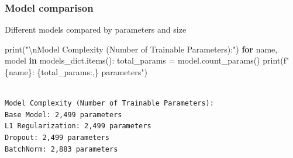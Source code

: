 \documentclass[
]{IEEEtran}
\newenvironment{Shaded}{\begin{snugshade}}{\end{snugshade}}
\newcommand{\BuiltInTok}[1]{\textcolor[rgb]{0.00,0.23,0.31}{#1}}
\newcommand{\CharTok}[1]{\textcolor[rgb]{0.13,0.47,0.30}{#1}}
\newcommand{\ControlFlowTok}[1]{\textcolor[rgb]{0.00,0.23,0.31}{\textbf{#1}}}
\newcommand{\KeywordTok}[1]{\textcolor[rgb]{0.00,0.23,0.31}{\textbf{#1}}}
\newcommand{\NormalTok}[1]{\textcolor[rgb]{0.00,0.23,0.31}{#1}}
\newcommand{\OperatorTok}[1]{\textcolor[rgb]{0.37,0.37,0.37}{#1}}
\newcommand{\SpecialCharTok}[1]{\textcolor[rgb]{0.37,0.37,0.37}{#1}}
\newcommand{\SpecialStringTok}[1]{\textcolor[rgb]{0.13,0.47,0.30}{#1}}
\newcommand{\StringTok}[1]{\textcolor[rgb]{0.13,0.47,0.30}{#1}}
\begin{document}
\subsubsection{Model comparison}\label{model-comparison}

Different models compared by parameters and size

\begin{Shaded}
\begin{Highlighting}[]
\BuiltInTok{print}\NormalTok{(}\StringTok{"}\CharTok{\textbackslash{}n}\StringTok{Model Complexity (Number of Trainable Parameters):"}\NormalTok{)}
\ControlFlowTok{for}\NormalTok{ name, model }\KeywordTok{in}\NormalTok{ models\_dict.items():}
\NormalTok{    total\_params }\OperatorTok{=}\NormalTok{ model.count\_params()}
    \BuiltInTok{print}\NormalTok{(}\SpecialStringTok{f"}\SpecialCharTok{\{}\NormalTok{name}\SpecialCharTok{\}}\SpecialStringTok{: }\SpecialCharTok{\{}\NormalTok{total\_params}\SpecialCharTok{:,\}}\SpecialStringTok{ parameters"}\NormalTok{)}
\end{Highlighting}
\end{Shaded}

\begin{verbatim}

Model Complexity (Number of Trainable Parameters):
Base Model: 2,499 parameters
L1 Regularization: 2,499 parameters
Dropout: 2,499 parameters
BatchNorm: 2,883 parameters
\end{verbatim}


\nocite{*}
\printbibliography
\end{document}
